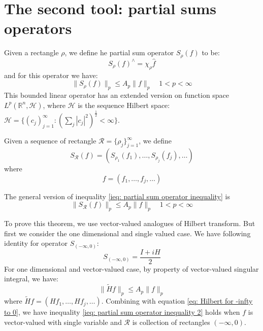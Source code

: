 \documentclass{report}
\theoremstyle{definition}
\theoremstyle{definition}
\theoremstyle{plain}
\numberwithin{theorem}{section}
\numberwithin{remark}{section}
\numberwithin{equation}{section}
\newcommand{\norm}[1]{\lVert#1\rVert}
\newcommand{\abs}[1]{\left\lvert#1\right\rvert}
\begin{document}
\section{The second tool: partial sums operators}
Given a rectangle $\rho$, we define he partial sum operator $S_\rho(f)$ to be:
\begin{equation*}
    S_\rho(f)^\wedge=\chi_\rho\hat{f}
\end{equation*}
and for this operator we have:
\begin{equation}\label{ieq: partial sum operator inequality}
    \norm{S_\rho(f)}_p\leq A_p\norm{f}_p\quad 1<p<\infty
\end{equation}
This bounded linear operator has an extended version on function space $L^p(\mathbb{R}^n,\mathscr{H})$, where $\mathscr{H}$ is the sequence Hilbert space: $\mathscr{H}=\{(c_j)_{j=1}^\infty:(\sum_j\abs{c_j}^2)^\frac{1}{2}< \infty\}$.\par
Given a sequence of rectangle $\mathscr{R}=\{\rho_j\}_{j=1}^\infty$, we define
\begin{equation*}
    S_{\mathscr{R}}(f)=(S_{\rho_1}(f_1),\dots,S_{\rho_j}(f_j),\dots)
\end{equation*}
where
\begin{equation*}
    f=(f_1,\dots,f_j,\dots)
\end{equation*}\par
The general version of inequality \eqref{ieq: partial sum operator inequality} is
\begin{equation}\label{ieq: partial sum operator inequality 2}
    \norm{S_{\mathscr{R}}(f)}_p\leq A_p\norm{f}_p\quad 1<p<\infty
\end{equation}\par
To prove this theorem, we use vector-valued analogues of Hilbert transform. But first we consider the one dimensional and single valued case. We have following identity for operator $S_{(-\infty,0)}$:
\begin{equation}\label{eq: Hilbert for -infty to 0}
    S_{(-\infty,0)}=\frac{I+iH}{2}
\end{equation}
For one dimensional and vector-valued case, by property of vector-valued singular integral, we have:
\begin{equation*}
    \norm{\tilde{H}f}_p\leq A_p\norm{f}_p
\end{equation*}
where $\tilde{H}f=(Hf_1,\dots,Hf_j,\dots)$. Combining with equation \eqref{eq: Hilbert for -infty to 0}, we have inequality \eqref{ieq: partial sum operator inequality 2} holds when $f$ is vector-valued with single variable and $\mathscr{R}$ is collection of rectangles $(-\infty,0)$.\par
\end{document}
